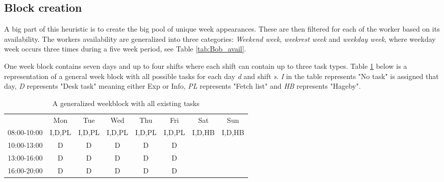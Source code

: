 \subsection{Block creation} \label{block_creation}
A big part of this heuristic is to create the big pool of unique week appearances. These are then filtered for each of the worker based on its availability. The workers availability are generalized into three categories: \textit{Weekend week}, \textit{weekrest week} and \textit{weekday week}, where weekday week occurs three times during a five week period, see Table \ref{tab:Bob_avail}. 


One week block contains seven days and up to four shifts where each shift can contain up to three task types. Table \ref{Generalized weekblock} below is a representation of a general week block with all possible tasks for each day \textit{d} and shift \textit{s}. \textit{I} in the table represents "No task" is assigned that day, \textit{D} represents "Desk task" meaning either Exp or Info, \textit{PL} represents "Fetch list" and \textit{HB} represents "Hageby". 

\begin{table}[!h]
\centering
\caption{A generalized weekblock with all existing tasks}
\label{Generalized weekblock}
\begin{tabular}{cccccccc}
                         & Mon                         & Tue                         & Wed                         & Thu                         & Fri                         & Sat                         & Sun                         \\ \cline{2-8} 
\multicolumn{1}{c|}{08:00-10:00} & \multicolumn{1}{c|}{I,D,PL} & \multicolumn{1}{c|}{I,D,PL} & \multicolumn{1}{c|}{I,D,PL} & \multicolumn{1}{c|}{I,D,PL} & \multicolumn{1}{c|}{I,D,PL} & \multicolumn{1}{c|}{I,D,HB} & \multicolumn{1}{c|}{I,D,HB} \\ \cline{2-8} 
\multicolumn{1}{c|}{10:00-13:00} & \multicolumn{1}{c|}{D}      & \multicolumn{1}{c|}{D}      & \multicolumn{1}{c|}{D}      & \multicolumn{1}{c|}{D}      & \multicolumn{1}{c|}{D}      &       \\ \cline{2-6} 
\multicolumn{1}{c|}{13:00-16:00} & \multicolumn{1}{c|}{D}      & \multicolumn{1}{c|}{D}      & \multicolumn{1}{c|}{D}      & \multicolumn{1}{c|}{D}      & \multicolumn{1}{c|}{D}      &       \\ \cline{2-6} 
\multicolumn{1}{c|}{16:00-20:00} & \multicolumn{1}{c|}{D}      & \multicolumn{1}{c|}{D}      & \multicolumn{1}{c|}{D}      & \multicolumn{1}{c|}{D}      & \multicolumn{1}{c|}{D}      &       \\ \cline{2-6} 
\end{tabular}
\end{table}

